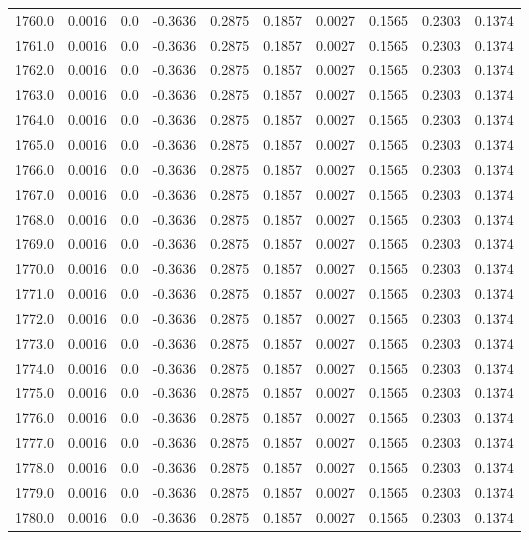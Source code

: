 \begin{longtable}{lrrrrrrrrr}
1760.0 & 0.0016 & 0.0 & -0.3636 & 0.2875 & 0.1857 & 0.0027 & 0.1565 & 0.2303 & 0.1374 \\
1761.0 & 0.0016 & 0.0 & -0.3636 & 0.2875 & 0.1857 & 0.0027 & 0.1565 & 0.2303 & 0.1374 \\
1762.0 & 0.0016 & 0.0 & -0.3636 & 0.2875 & 0.1857 & 0.0027 & 0.1565 & 0.2303 & 0.1374 \\
1763.0 & 0.0016 & 0.0 & -0.3636 & 0.2875 & 0.1857 & 0.0027 & 0.1565 & 0.2303 & 0.1374 \\
1764.0 & 0.0016 & 0.0 & -0.3636 & 0.2875 & 0.1857 & 0.0027 & 0.1565 & 0.2303 & 0.1374 \\
1765.0 & 0.0016 & 0.0 & -0.3636 & 0.2875 & 0.1857 & 0.0027 & 0.1565 & 0.2303 & 0.1374 \\
1766.0 & 0.0016 & 0.0 & -0.3636 & 0.2875 & 0.1857 & 0.0027 & 0.1565 & 0.2303 & 0.1374 \\
1767.0 & 0.0016 & 0.0 & -0.3636 & 0.2875 & 0.1857 & 0.0027 & 0.1565 & 0.2303 & 0.1374 \\
1768.0 & 0.0016 & 0.0 & -0.3636 & 0.2875 & 0.1857 & 0.0027 & 0.1565 & 0.2303 & 0.1374 \\
1769.0 & 0.0016 & 0.0 & -0.3636 & 0.2875 & 0.1857 & 0.0027 & 0.1565 & 0.2303 & 0.1374 \\
1770.0 & 0.0016 & 0.0 & -0.3636 & 0.2875 & 0.1857 & 0.0027 & 0.1565 & 0.2303 & 0.1374 \\
1771.0 & 0.0016 & 0.0 & -0.3636 & 0.2875 & 0.1857 & 0.0027 & 0.1565 & 0.2303 & 0.1374 \\
1772.0 & 0.0016 & 0.0 & -0.3636 & 0.2875 & 0.1857 & 0.0027 & 0.1565 & 0.2303 & 0.1374 \\
1773.0 & 0.0016 & 0.0 & -0.3636 & 0.2875 & 0.1857 & 0.0027 & 0.1565 & 0.2303 & 0.1374 \\
1774.0 & 0.0016 & 0.0 & -0.3636 & 0.2875 & 0.1857 & 0.0027 & 0.1565 & 0.2303 & 0.1374 \\
1775.0 & 0.0016 & 0.0 & -0.3636 & 0.2875 & 0.1857 & 0.0027 & 0.1565 & 0.2303 & 0.1374 \\
1776.0 & 0.0016 & 0.0 & -0.3636 & 0.2875 & 0.1857 & 0.0027 & 0.1565 & 0.2303 & 0.1374 \\
1777.0 & 0.0016 & 0.0 & -0.3636 & 0.2875 & 0.1857 & 0.0027 & 0.1565 & 0.2303 & 0.1374 \\
1778.0 & 0.0016 & 0.0 & -0.3636 & 0.2875 & 0.1857 & 0.0027 & 0.1565 & 0.2303 & 0.1374 \\
1779.0 & 0.0016 & 0.0 & -0.3636 & 0.2875 & 0.1857 & 0.0027 & 0.1565 & 0.2303 & 0.1374 \\
1780.0 & 0.0016 & 0.0 & -0.3636 & 0.2875 & 0.1857 & 0.0027 & 0.1565 & 0.2303 & 0.1374 \\

\end{longtable}
